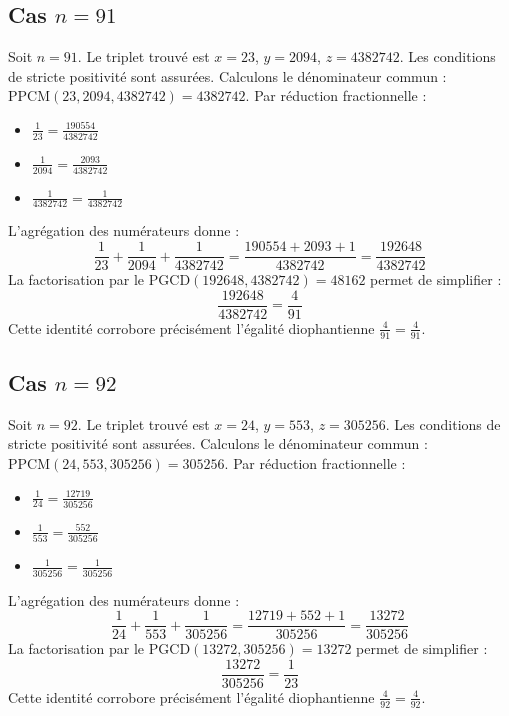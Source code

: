 \documentclass[11pt,a4paper]{article}
\begin{document}
\subsection{Cas $n = 91$}
Soit $n = 91$. Le triplet trouvé est $x = 23$, $y = 2094$, $z = 4382742$.
Les conditions de stricte positivité sont assurées.
Calculons le dénominateur commun : $\text{PPCM}(23, 2094, 4382742) = 4382742$.
Par réduction fractionnelle :
\begin{itemize}
    \item $\frac{1}{23} = \frac{190554}{4382742}$
    \item $\frac{1}{2094} = \frac{2093}{4382742}$
    \item $\frac{1}{4382742} = \frac{1}{4382742}$
\end{itemize}
L'agrégation des numérateurs donne :
$$ \frac{1}{23} + \frac{1}{2094} + \frac{1}{4382742} = \frac{190554 + 2093 + 1}{4382742} = \frac{192648}{4382742} $$
La factorisation par le $\text{PGCD}(192648, 4382742) = 48162$ permet de simplifier :
$$ \frac{192648}{4382742} = \frac{4}{91} $$
Cette identité corrobore précisément l'égalité diophantienne $\frac{4}{91} = \frac{4}{91}$.

\subsection{Cas $n = 92$}
Soit $n = 92$. Le triplet trouvé est $x = 24$, $y = 553$, $z = 305256$.
Les conditions de stricte positivité sont assurées.
Calculons le dénominateur commun : $\text{PPCM}(24, 553, 305256) = 305256$.
Par réduction fractionnelle :
\begin{itemize}
    \item $\frac{1}{24} = \frac{12719}{305256}$
    \item $\frac{1}{553} = \frac{552}{305256}$
    \item $\frac{1}{305256} = \frac{1}{305256}$
\end{itemize}
L'agrégation des numérateurs donne :
$$ \frac{1}{24} + \frac{1}{553} + \frac{1}{305256} = \frac{12719 + 552 + 1}{305256} = \frac{13272}{305256} $$
La factorisation par le $\text{PGCD}(13272, 305256) = 13272$ permet de simplifier :
$$ \frac{13272}{305256} = \frac{1}{23} $$
Cette identité corrobore précisément l'égalité diophantienne $\frac{4}{92} = \frac{4}{92}$.
\end{document}
